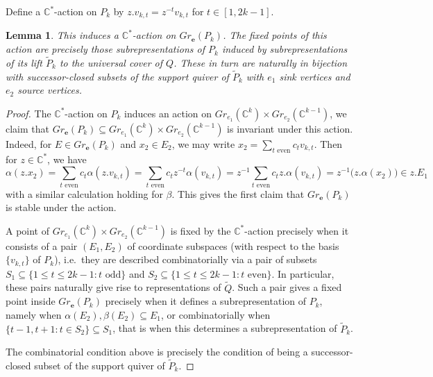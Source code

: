 \documentclass{amsart}
\newtheorem{lemma}[theorem]{Lemma}
\numberwithin{equation}{section}
\newcommand{\CC}{\mathbb{C}}
\newcommand{\bfe}{\mathbf{e}}
\begin{document}
    Define a $\CC^*$-action on $P_k$ by $z.v_{k,t}=z^{-t}v_{k,t}$ for $t\in[1,2k-1]$.
    \begin{lemma}
      This induces a $\CC^*$-action on $Gr_\bfe(P_k)$.
      The fixed points of this action are precisely those subrepresentations of $P_k$ induced by subrepresentations of its lift $\widetilde P_k$ to the universal cover of $Q$.
      These in turn are naturally in bijection with successor-closed subsets of the support quiver of $\widetilde P_k$ with $e_1$ sink vertices and $e_2$ source vertices.
    \end{lemma}
    \begin{proof}
      The $\CC^*$-action on $P_k$ induces an action on $Gr_{e_1}(\CC^k)\times Gr_{e_2}(\CC^{k-1})$, we claim that $Gr_\bfe(P_k)\subseteq Gr_{e_1}(\CC^k)\times Gr_{e_2}(\CC^{k-1})$ is invariant under this action.
      Indeed, for $E\in Gr_\bfe(P_k)$ and $x_2\in E_2$, we may write $x_2=\sum\limits_{\text{$t$ even}} c_t v_{k,t}$.
      Then for $z\in\CC^*$, we have 
      \[\alpha(z.x_2)=\sum\limits_{\text{$t$ even}} c_t \alpha(z.v_{k,t})=\sum\limits_{\text{$t$ even}} c_t z^{-t}\alpha(v_{k,t})=z^{-1}\sum\limits_{\text{$t$ even}} c_t z.\alpha(v_{k,t})=z^{-1} \big(z.\alpha(x_2)\big)\in z.E_1\]
      with a similar calculation holding for $\beta$.
      This gives the first claim that $Gr_\bfe(P_k)$ is stable under the action.
 
      A point of $Gr_{e_1}(\CC^k)\times Gr_{e_2}(\CC^{k-1})$ is fixed by the $\CC^*$-action precisely when it consists of a pair $(E_1,E_2)$ of coordinate subspaces (with respect to the basis $\{v_{k,t}\}$ of $P_k$), i.e.\ they are described combinatorially via a pair of subsets $S_1\subseteq\{1\le t\le 2k-1:\text{$t$ odd}\}$ and $S_2\subseteq\{1\le t\le 2k-1:\text{$t$ even}\}$.
      In particular, these pairs naturally give rise to representations of $\widetilde Q$.
      Such a pair gives a fixed point inside $Gr_\bfe(P_k)$ precisely when it defines a subrepresentation of $P_k$, namely when $\alpha(E_2),\beta(E_2)\subseteq E_1$, or combinatorially when $\{t-1,t+1:t\in S_2\}\subseteq S_1$, that is when this determines a subrepresentation of $\widetilde P_k$.
 
      The combinatorial condition above is precisely the condition of being a successor-closed subset of the support quiver of $\widetilde P_k$.
    \end{proof}
    
\end{document}
